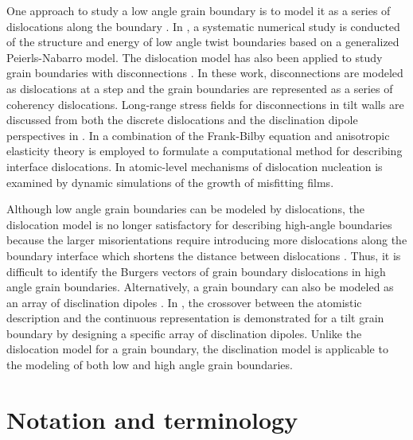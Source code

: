 \documentclass[11pt,letterpaper]{article}
\begin{document}
One approach to study a low angle grain boundary is to model it as a series of dislocations along the boundary \cite{read1950dislocation, sutton1983structure1, sutton1983structure2}. In \cite{dai2013structure}, a systematic numerical study is conducted of the structure and energy of low angle twist boundaries based on a generalized Peierls-Nabarro model. The dislocation model has also been applied to study grain boundaries with disconnections \cite{hirth1996steps, hirth1998extended, hirth2006disconnections, hirth2007spacing, howe2009role, hirth2011compatibility, hirth2013interface}. In these work, disconnections are modeled as dislocations at a step and the grain boundaries are represented as a series of coherency dislocations.  Long-range stress fields for disconnections in tilt walls are discussed from both the discrete dislocations and the disclination dipole perspectives in \cite{akarapu2008modeling}. In \cite{vattre2013determining, vattre2014computational, vattre2015partitioning} a combination of the Frank-Bilby equation \cite{frank1950resultant, FRANK195315, Bilby263,sutton1995interfaces,bullough1956continuous} and anisotropic elasticity theory is employed to formulate a computational method for describing interface dislocations. In \cite{dong1998stress} atomic-level mechanisms of dislocation nucleation is examined by dynamic simulations of the growth of misfitting films. 

Although low angle grain boundaries can be modeled by dislocations, the dislocation model is no longer satisfactory for describing high-angle boundaries because the larger misorientations require introducing more dislocations along the boundary interface which shortens the distance between dislocations \cite{balluffi2005kinetics}. Thus, it is difficult to identify the Burgers vectors of grain boundary dislocations in high angle grain boundaries. Alternatively, a grain boundary can also be modeled as an array of disclination dipoles \cite{romanov2009application, nazarov2000disclination}.  In \cite{fressengeas2014continuous}, the crossover between the atomistic description and the continuous representation is demonstrated for a tilt grain boundary by designing a specific array of disclination dipoles. Unlike the dislocation model for a grain boundary, the disclination model is applicable to the modeling of both low and high angle grain boundaries.
 
\section{Notation and terminology} \label{sec:notation}
\end{document}
